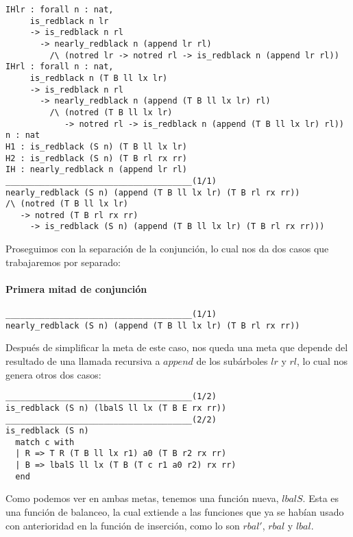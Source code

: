 \begin{verbatim}
IHlr : forall n : nat,
     is_redblack n lr
     -> is_redblack n rl
       -> nearly_redblack n (append lr rl)
         /\ (notred lr -> notred rl -> is_redblack n (append lr rl))
IHrl : forall n : nat,
     is_redblack n (T B ll lx lr)
     -> is_redblack n rl
       -> nearly_redblack n (append (T B ll lx lr) rl)
         /\ (notred (T B ll lx lr)
            -> notred rl -> is_redblack n (append (T B ll lx lr) rl))
n : nat
H1 : is_redblack (S n) (T B ll lx lr)
H2 : is_redblack (S n) (T B rl rx rr)
IH : nearly_redblack n (append lr rl)
______________________________________(1/1)
nearly_redblack (S n) (append (T B ll lx lr) (T B rl rx rr))
/\ (notred (T B ll lx lr)
   -> notred (T B rl rx rr)
     -> is_redblack (S n) (append (T B ll lx lr) (T B rl rx rr)))
\end{verbatim}

Proseguimos con la separaci\'on de la conjunci\'on, lo cual nos da dos casos que trabajaremos por
separado:

\paragraph{Primera mitad de conjunci\'on}

\begin{verbatim}
______________________________________(1/1)
nearly_redblack (S n) (append (T B ll lx lr) (T B rl rx rr))
\end{verbatim}

Después de simplificar la meta de este caso, nos queda una meta que depende del resultado de una
llamada recursiva a \hyperref[func_app]{$append$} de los subárboles $lr$ y $rl$, lo cual nos genera 
otros dos casos:

\begin{verbatim}
______________________________________(1/2)
is_redblack (S n) (lbalS ll lx (T B E rx rr))
______________________________________(2/2)
is_redblack (S n)
  match c with
  | R => T R (T B ll lx r1) a0 (T B r2 rx rr)
  | B => lbalS ll lx (T B (T c r1 a0 r2) rx rr)
  end
\end{verbatim}

Como podemos ver en ambas metas, tenemos una funci\'on nueva, \hyperref[lbalS]{$lbalS$}. Esta es una 
funci\'on de balanceo, la cual extiende a las funciones que ya se habían usado con anterioridad en la 
funci\'on de inserci\'on, como lo son \hyperref[rbal_2]{$rbal'$}, \hyperref[func_balanceo]{$rbal$} y 
\hyperref[func_balanceo]{$lbal$}.

